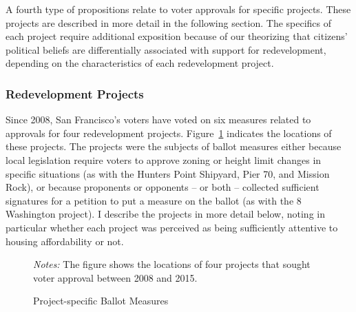 \documentclass[article,11pt]{memoir}
\begin{document}
A fourth type of propositions relate to voter approvals for specific projects. These projects are described in more detail in the following section.  The specifics of each project require additional exposition because of our theorizing that citizens' political beliefs are differentially associated with support for redevelopment, depending on the characteristics of each redevelopment project.

\subsubsection{Redevelopment Projects}\label{sec:g_redev}

Since 2008, San Francisco's voters have voted on six measures related to approvals for four redevelopment projects. Figure~\ref{fig:g_devs} indicates the locations of these projects. The projects were the subjects of ballot measures either because local legislation require voters to approve zoning or height limit changes in specific situations (as with the Hunters Point Shipyard, Pier 70, and Mission Rock), or because proponents or opponents -- or both -- collected sufficient signatures for a petition to put a measure on the ballot (as with the 8 Washington project).  I describe the projects in more detail below, noting in particular whether each project was perceived as being sufficiently attentive to housing affordability or not.

\begin{figure}[tb]\centering
  \caption{Project-specific Ballot Measures}
  \label{fig:g_devs}
  \begin{measuredfigure}
  \end{measuredfigure}
  \begin{tablenotes}[flushleft]
    \item \hspace{-.2em}\emph{Notes:} The figure shows the locations of four projects that sought voter approval between 2008 and 2015.
  \end{tablenotes}
\end{figure}
\end{document}
